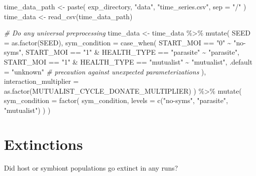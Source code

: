 \documentclass[
]{book}
\newenvironment{Shaded}{\begin{snugshade}}{\end{snugshade}}
\newcommand{\AttributeTok}[1]{\textcolor[rgb]{0.77,0.63,0.00}{#1}}
\newcommand{\CommentTok}[1]{\textcolor[rgb]{0.56,0.35,0.01}{\textit{#1}}}
\newcommand{\FunctionTok}[1]{\textcolor[rgb]{0.00,0.00,0.00}{#1}}
\newcommand{\NormalTok}[1]{#1}
\newcommand{\OtherTok}[1]{\textcolor[rgb]{0.56,0.35,0.01}{#1}}
\newcommand{\SpecialCharTok}[1]{\textcolor[rgb]{0.00,0.00,0.00}{#1}}
\newcommand{\StringTok}[1]{\textcolor[rgb]{0.31,0.60,0.02}{#1}}
\begin{document}
\begin{Shaded}
\begin{Highlighting}[]
\NormalTok{time\_data\_path }\OtherTok{\textless{}{-}} \FunctionTok{paste}\NormalTok{(}
\NormalTok{  exp\_directory,}
  \StringTok{"data"}\NormalTok{,}
  \StringTok{"time\_series.csv"}\NormalTok{,}
  \AttributeTok{sep =} \StringTok{"/"}
\NormalTok{)}
\NormalTok{time\_data }\OtherTok{\textless{}{-}} \FunctionTok{read\_csv}\NormalTok{(time\_data\_path)}

\CommentTok{\# Do any universal preprocessing}
\NormalTok{time\_data }\OtherTok{\textless{}{-}}\NormalTok{ time\_data }\SpecialCharTok{\%\textgreater{}\%}
  \FunctionTok{mutate}\NormalTok{(}
    \AttributeTok{SEED =} \FunctionTok{as.factor}\NormalTok{(SEED),}
    \AttributeTok{sym\_condition =} \FunctionTok{case\_when}\NormalTok{(}
\NormalTok{      START\_MOI }\SpecialCharTok{==} \StringTok{"0"} \SpecialCharTok{\textasciitilde{}} \StringTok{"no{-}syms"}\NormalTok{,}
\NormalTok{      START\_MOI }\SpecialCharTok{==} \StringTok{"1"} \SpecialCharTok{\&}\NormalTok{ HEALTH\_TYPE }\SpecialCharTok{==} \StringTok{"parasite"} \SpecialCharTok{\textasciitilde{}} \StringTok{"parasite"}\NormalTok{,}
\NormalTok{      START\_MOI }\SpecialCharTok{==} \StringTok{"1"} \SpecialCharTok{\&}\NormalTok{ HEALTH\_TYPE }\SpecialCharTok{==} \StringTok{"mutualist"} \SpecialCharTok{\textasciitilde{}} \StringTok{"mutualist"}\NormalTok{,}
      \AttributeTok{.default =} \StringTok{"unknown"} \CommentTok{\# precaution against unexpected parameterizations}
\NormalTok{    ),}
    \AttributeTok{interaction\_multiplier =} \FunctionTok{as.factor}\NormalTok{(MUTUALIST\_CYCLE\_DONATE\_MULTIPLIER)}
\NormalTok{  ) }\SpecialCharTok{\%\textgreater{}\%}
  \FunctionTok{mutate}\NormalTok{(}
    \AttributeTok{sym\_condition =} \FunctionTok{factor}\NormalTok{(}
\NormalTok{      sym\_condition,}
      \AttributeTok{levels =} \FunctionTok{c}\NormalTok{(}\StringTok{"no{-}syms"}\NormalTok{, }\StringTok{"parasite"}\NormalTok{, }\StringTok{"mutualist"}\NormalTok{)}
\NormalTok{    )}
\NormalTok{  )}
\end{Highlighting}
\end{Shaded}

\hypertarget{extinctions-4}{%
\section{Extinctions}\label{extinctions-4}}

Did host or symbiont populations go extinct in any runs?
\end{document}
